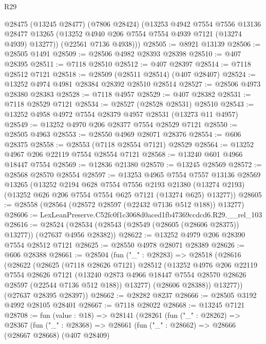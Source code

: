 \begin{lexlean}{R29}
\begin{coremodule}
      @28475
        (@13245 @28477)
        (@7806 @28424)
        (@13253
          @4942
          @7554
          @7556
          @13136
          @28477
          @13265
          (@13252 @4940 @206 @7554 @7554 @4939 @7121 (@13274 @4939) @13277))
        (@22561 @7136 @4938)))
@28505 := @8921 @13139
@28506 := @28505 @1491
@28509 := @28506 @4982 @28393 @28398
@28510 := @407 @28395
@28511 := @7118 @28510
@28512 := @407 @28397
@28514 := @7118 @28512 @7121
@28518 := @28509 (@28511 @28514) (@407 @28407)
@28524 := @13252 @4974 @4981 @28384 @28392 @28510 @28514
@28527 := @28506 @4973 @28380 @28383
@28528 := @7118 @4957
@28529 := @407 @28382
@28531 := @7118 @28529 @7121
@28534 := @28527 (@28528 @28531) @28510
@28543 := @13252 @4958 @4972 @7554 @28379 @4957 @28531 (@13273 @11 @4957)
@28549 := @13252 @4970 @206 @28377 @7554 @28529 @7121
@28550 := @28505 @4963
@28553 := @28550 @4969 @28071 @28376
@28554 := @606 @28375
@28558 := @28553 (@7118 @28554 @7121) @28529
@28564 := @13252 @4967 @206 @22119 @7554 @28554 @7121
@28568 := @13240 @601 @4966 @18447 @7554
@28569 := @12836 @21380
@28570 := @13245 @28569
@28572 := @28568 @28570 @28554
@28597 := @13253
    @4965
    @7554
    @7557
    @13136
    @28569
    @13265
    (@13252
      @2194
      @628
      @7554
      @7556
      @2193
      @21380
      (@13274 @2193)
      (@13252 @626 @206 @7554 @7554 @625 @7121 (@13274 @625) @13277))
@28605 := @28558 (@28564 (@28572 @28597 (@22432 @7136 @512 @188)) @13277)
@28606 := LexLeanPreserve.C52fc0f1c3068d0aced1fb47369ccdcd6.R29.__rel_103
@28616 := @28524 (@28534 (@28543 (@28549 (@28605 (@28606 @28375)) @13277)) (@27637 @4956 @28382))
@28622 := @13252 @4979 @206 @28390 @7554 @28512 @7121
@28625 := @28550 @4978 @28071 @28389
@28626 := @606 @28388
@28661 := @28504
    (fun ("_" : @28283) =>
    @28518
      (@28616
        (@28622
          (@28625
            (@7118 @28626 @7121)
            @28512
            (@13252
              @4976
              @206
              @22119
              @7554
              @28626
              @7121
              (@13240 @2873 @4966 @18447 @7554 @28570 @28626 @28597 (@22544 @7136 @512 @188))
              @13277)
            (@28606 @28388))
          @13277))
      (@27637 @28395 @28397))
@28662 := @28282 @8237
@28666 := @28505 @3192 @4992 @28105 @28401
@28667 := @7118 @28022
@28668 := @13245 @7121
@28708 := fun (value : @18) =>
  @28141
    (@28261
      (fun ("_" : @28262) =>
      @28367
        (fun ("_" : @28368) =>
        @28661
          (fun ("_" : @28662) =>
          @28666
            (@28667 @28668)
            (@407 @28409)

\end{coremodule}
\end{lexlean}
